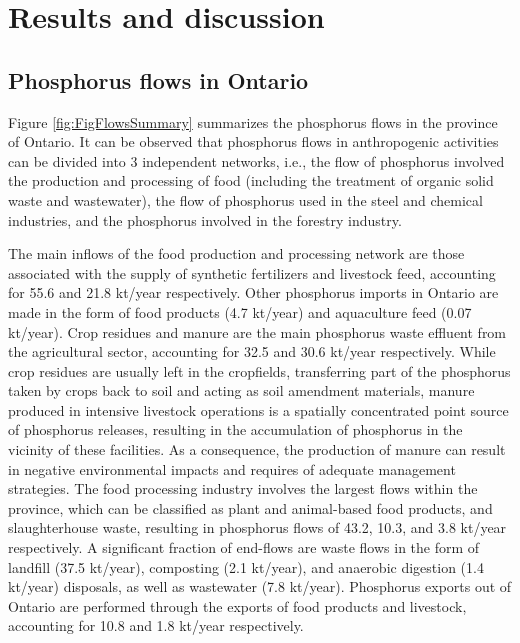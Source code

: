 \documentclass[authoryear]{elsarticle}
\begin{document}
\section{Results and discussion}
\subsection{Phosphorus flows in Ontario}

Figure \ref{fig:FigFlowsSummary} summarizes the phosphorus flows in the province of Ontario. It can be observed that phosphorus flows in anthropogenic activities can be divided into 3 independent networks, i.e., the flow of phosphorus involved the production and processing of food (including the treatment of organic solid waste and  wastewater), the flow of phosphorus used in the steel and chemical industries, and the phosphorus involved in the forestry industry.

The main inflows of the food production and processing network are those associated with the supply of synthetic fertilizers and livestock feed, accounting for 55.6 and 21.8 kt/year respectively. Other phosphorus imports in Ontario are made in the form of food products (4.7 kt/year) and aquaculture feed (0.07 kt/year). Crop residues and manure are the main phosphorus waste effluent from the agricultural sector, accounting for 32.5 and 30.6 kt/year respectively.
While crop residues are usually left in the cropfields, transferring part of the phosphorus taken by crops back to soil and acting as soil amendment materials,
manure produced in intensive livestock operations is a spatially concentrated point source of phosphorus releases, resulting in the accumulation of phosphorus in the vicinity of these facilities. As a consequence, the production of manure can result in negative environmental impacts and requires of adequate management strategies. The food processing industry involves the largest flows within the province, which can be classified as plant and animal-based food products, and slaughterhouse waste, resulting in phosphorus flows of 43.2, 10.3, and 3.8 kt/year respectively. A significant fraction of end-flows are waste flows in the form of landfill (37.5 kt/year), composting (2.1 kt/year), and anaerobic digestion (1.4 kt/year) disposals, as well as wastewater (7.8 kt/year). Phosphorus exports out of Ontario are performed through the exports of food products and livestock, accounting for 10.8 and 1.8 kt/year respectively.
\end{document}
